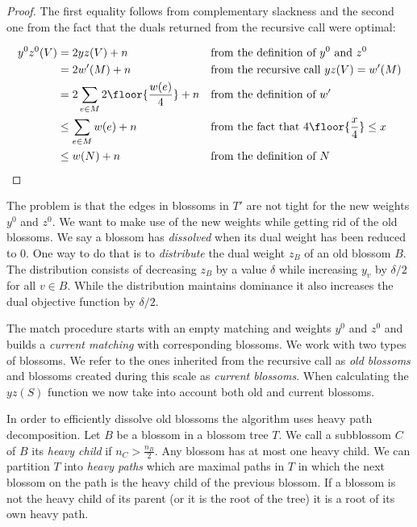 \begin{proof}
    The first equality follows from complementary slackness and the second one from the fact that the duals returned from the recursive call were optimal:

    \begin{align*}
        y^0z^0(V) &= 2yz(V) + n && \text{from the definition of $y^0$ and $z^0$}\\
        &= 2w'(M) + n && \text{from the recursive call $yz(V) = w'(M)$} \\
        &= 2 \sum_{e \in M} 2 \floor{\frac{w(e)}{4}} + n && \text{from the definition of $w'$} \\
        &\leq \sum_{e \in M} w(e) + n && \text{from the fact that $4\floor{\frac{x}{4}} \leq x$} \\
        &\leq w(N) + n  && \text{from the definition of $N$} \\
    \end{align*}    
\end{proof}

The problem is that the edges in blossoms in $T'$ are not tight for the new weights $y^0$ and $z^0$. We want to make use of the new weights while getting rid of the old blossoms. We say a blossom has \textit{dissolved} when its dual weight has been reduced to $0$. One way to do that is to \textit{distribute} the dual weight $z_B$ of an old blossom $B$. The distribution consists of decreasing $z_B$ by a value $\delta$ while increasing $y_v$ by $\delta / 2$ for all $v \in B$. While the distribution maintains dominance it also increases the dual objective function by $\delta / 2$. 

The match procedure starts with an empty matching and weights $y^0$ and $z^0$ and builds a \textit{current matching} with corresponding blossoms. We work with two types of blossoms. We refer to the ones inherited from the recursive call as \textit{old blossoms} and blossoms created during this scale as \textit{current blossoms}. When calculating the $yz(S)$ function we now take into account both old and current blossoms.

In order to efficiently dissolve old blossoms the algorithm uses heavy path decomposition. Let $B$ be a blossom in a blossom tree $T$. We call a subblossom $C$ of $B$ its \textit{heavy child} if $n_C > \frac{n_B}{2}$. Any blossom has at most one heavy child. We can partition $T$ into \textit{heavy paths} which are maximal paths in $T$ in which the next blossom on the path is the heavy child of the previous blossom. If a blossom is not the heavy child of its parent (or it is the root of the tree) it is a root of its own heavy path.

